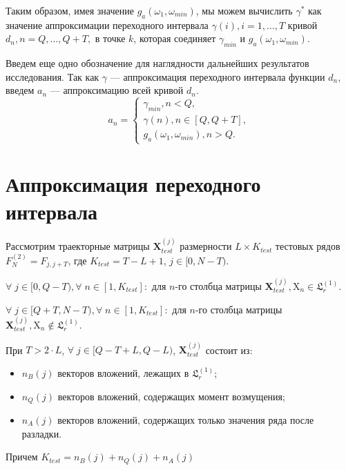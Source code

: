 \documentclass[specialist, substylefile = spbu.rtx,
			   subf, href, 12pt]{disser}
\begin{document}
Таким образом, имея значение $ g_a(\omega_1, \omega_{min}) $, мы можем вычислить $ \gamma^* $ как значение аппроксимации переходного интервала $ \gamma(i), i=1, \dots, T $ кривой $ d_n, n=Q, \dots, Q+T, $ в точке $ k $, которая соединяет $ \gamma_{min} $ и $ g_a(\omega_1, \omega_{min}) $. 

Введем еще одно обозначение для наглядности дальнейших результатов исследования. Так как $ \gamma $ --- аппроксимация переходного интервала функции $ d_n $, введем $ a_n $ --- аппроксимацию всей кривой $ d_n $.
\begin{equation}\label{eq:a_n}
	a_n = 
	\begin{cases}
		\gamma_{min}, n < Q,\\
		\gamma(n), n \in [Q, Q+T],\\
		g_a(\omega_1, \omega_{min}), n > Q.
	\end{cases}
\end{equation}


\section{Аппроксимация переходного интервала}\label{ch:approx_d_n}
Рассмотрим траекторные матрицы $ \mathbf{X}_{test}^{(j)} $ размерности $ L \times K_{test} $ тестовых рядов $ F_N^{(2)} = F_{j, j+T} $, где $ K_{test} = T - L + 1 $, $ j \in [0, N-T) $. 

$ \forall \; j \in [0, Q - T), \forall \; n \in [1, K_{test}]: $ для $ n $-го столбца матрицы $ \mathbf{X}_{test}^{(j)},  \mathrm{X}_n \in \mathfrak{L}_r^{(1)} $. 

$ \forall \; j \in [Q+T, N-T), \forall \; n \in [1, K_{test}]: $ для $ n $-го столбца матрицы $ \mathbf{X}_{test}^{(j)},  \mathrm{X}_n \notin \mathfrak{L}_r^{(1)} $. 

\bigskip

При $ T > 2 \cdot L $, $ \forall \; j \in [Q - T + L, Q - L)$, $ \mathbf{X}_{test}^{(j)} $ состоит из:

\begin{itemize}
	\item $ n_B(j) $ векторов вложений, лежащих в $ \mathfrak{L}_r^{(1)} $;
	\item $ n_Q(j) $ векторов вложений, содержащих момент возмущения;
	\item $ n_A(j) $ векторов вложений, содержащих только значения ряда после разладки.
\end{itemize}

Причем $ K_{test} = n_B(j) + n_Q(j) + n_A(j) $
\end{document}
